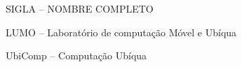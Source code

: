 \section*{} 

SIGLA		– 	NOMBRE COMPLETO 

LUMO		–	Laboratório de computação Móvel e Ubíqua

UbiComp	–  	Computação Ubíqua 